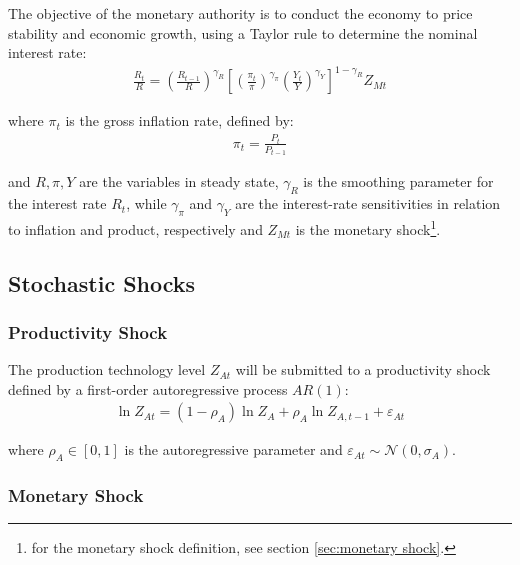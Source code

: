 \documentclass[
	thesis.tex
	]{subfiles}
\begin{document}
The objective of the monetary authority is to conduct the economy to price stability and economic growth, using a Taylor rule \cite{taylor_discretion_1993} to determine the nominal interest rate:
\begin{align}
	\label{eq:monetary-policy}
	\frac{R_t}{R} =
	\left( \frac{R_{t-1}}{R} \right)^{\gamma_R}  \left[
	\left( \frac{\pi_t}{\pi} \right)^{\gamma_\pi}
	\left( \frac{Y_t}{Y} \right)^{\gamma_Y} \right]^{1-\gamma_R} Z_{Mt}
\end{align}

where $\pi_t$ is the gross inflation rate, defined by:
\begin{align}
	\pi_t = \frac{P_t}{P_{t-1}}
	\label{eq:gross-inflation-rate}
\end{align}

and $R, \pi, Y$ are the variables in steady state, $\gamma_R$ is the smoothing parameter for the interest rate $R_t$, while $\gamma_\pi$ and $\gamma_Y$ are the interest-rate sensitivities in relation to inflation and product, respectively and $Z_{Mt}$ is the monetary shock\footnote{for the monetary shock definition, see section \ref{sec:monetary shock}.}.


\subsection{Stochastic Shocks}\label{sec:stochastic-shocks}

\subsubsection*{Productivity Shock} \label{sec:productivity shock}

The production technology level $Z_{At}$ will be submitted to a productivity shock defined by a first-order autoregressive process $AR(1)$:
\begin{align}
	\ln{Z_{At}} = (1-\rho_A)\ln{Z_A} + \rho_A\ln{Z_{A,t-1}} + \varepsilon_{At} \label{eq:productivity-shock}
\end{align}

where $\rho_A \in [0,1]$ is the autoregressive parameter and $\varepsilon_{At} \sim \mathscr{N}(0,\sigma_A)$.

\subsubsection*{Monetary Shock} \label{sec:monetary shock}
\end{document}
